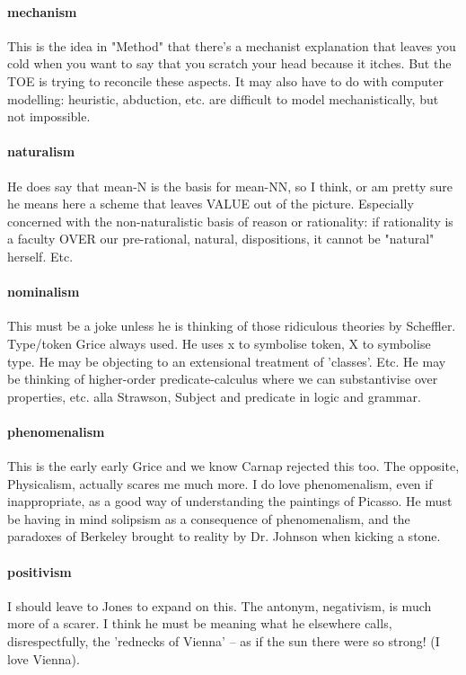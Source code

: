 \documentclass{article}
\begin{document}
\paragraph{mechanism}
This is the idea in "Method" that there's a mechanist  
explanation that leaves you cold when you want to say that you scratch your head  
because it itches. But the TOE is trying to reconcile these aspects. It may 
also  have to do with computer modelling: heuristic, abduction, etc. are 
difficult to  model mechanistically, but not impossible.
 
\paragraph{naturalism}
He does say that mean-N is the basis for mean-NN, so I think,  
or am pretty sure he means here a scheme that leaves VALUE out of the 
picture.  Especially concerned with the non-naturalistic basis of reason or 
rationality:  if rationality is a faculty OVER our pre-rational, natural, 
dispositions, it  cannot be "natural" herself. Etc.
 
\paragraph{nominalism}
This must be a joke unless he is thinking of those ridiculous  
theories by Scheffler. Type/token Grice always used. He uses x to symbolise  
token, X to symbolise type. He may be objecting to an extensional treatment 
of  'classes'. Etc. He may be thinking of higher-order predicate-calculus 
where we  can substantivise over properties, etc. alla Strawson, Subject and 
predicate in  logic and grammar.
 
\paragraph{phenomenalism}
This is the early early Grice and we know Carnap rejected  
this too. The opposite, Physicalism, actually scares me much more. I do love  
phenomenalism, even if inappropriate, as a good way of understanding the  
paintings of Picasso. He must be having in mind solipsism as a consequence of 
 phenomenalism, and the paradoxes of Berkeley brought to reality by Dr. 
Johnson  when kicking a stone.

\paragraph{positivism}
I should leave to Jones to expand on this. The antonym,  
negativism, is much more of a scarer. I think he must be meaning what he  
elsewhere calls, disrespectfully, the 'rednecks of Vienna' -- as if the sun  there 
were so strong! (I love Vienna).
 
\end{document}
